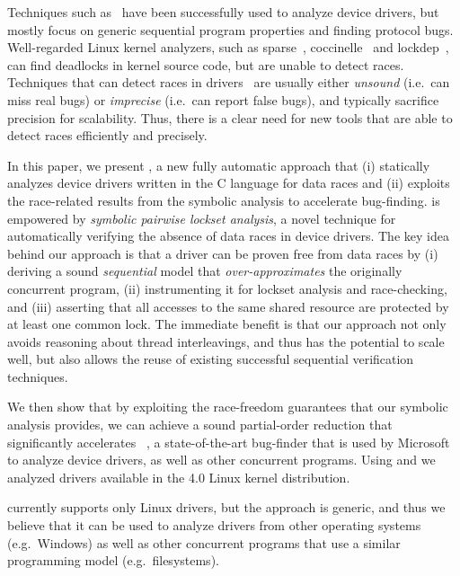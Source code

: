 Techniques such as~\cite{ball2006thorough, clarke2004predicate, engler2000checking, henzinger2002temporal, cook2006termination, kuznetsov2010testing, renzelmann2012symdrive, lal2012corral} have been successfully used to analyze device drivers, but mostly focus on generic sequential program properties and finding protocol bugs. Well-regarded Linux kernel analyzers, such as sparse~\cite{corbet2004sparse}, coccinelle~\cite{padioleau2008doc} and lockdep~\cite{corbet2006lock}, can find deadlocks in kernel source code, but are unable to detect races. Techniques that can detect races in drivers~\cite{qadeer2004kiss, pratikakis2006locksmith, voung2007relay, lal2012corral} are usually either \emph{unsound} (i.e.\ can miss real bugs) or \emph{imprecise} (i.e.\ can report false bugs), and typically sacrifice precision for scalability. Thus, there is a clear need for new tools that are able to detect races efficiently and precisely.

In this paper, we present \whoop, a new fully automatic approach that (i) statically analyzes device drivers written in the C language for data races and (ii) exploits the race-related results from the symbolic analysis to accelerate bug-finding. \whoop is empowered by \emph{symbolic pairwise lockset analysis}, a novel technique for automatically verifying the absence of data races in device drivers. The key idea behind our approach is that a driver can be proven free from data races by (i) deriving a sound \emph{sequential} model that \emph{over-approximates} the originally concurrent program, (ii) instrumenting it for lockset analysis and race-checking, and (iii) asserting that all accesses to the same shared resource are protected by at least one common lock. The immediate benefit is that our approach not only avoids reasoning about thread interleavings, and thus has the potential to scale well, but also allows the reuse of existing successful sequential verification techniques.

We then show that by exploiting the race-freedom guarantees that our symbolic analysis provides, we can achieve a sound partial-order reduction that significantly accelerates \corral~\cite{lal2012corral}, a state-of-the-art bug-finder that is used by Microsoft to analyze device drivers, as well as other concurrent programs. Using \whoop and \corral we analyzed \sizeOfBenchmarks drivers available in the 4.0 Linux kernel distribution.

\whoop currently supports only Linux drivers, but the approach is generic, and thus we believe that it can be used to analyze drivers from other operating systems (e.g.\ Windows) as well as other concurrent programs that use a similar programming model (e.g.\ filesystems).

